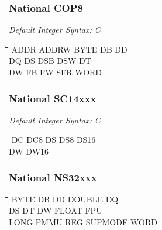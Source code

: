 \subsubsection{National COP8}

{\em Default Integer Syntax: C}

{\tt\begin{tabbing}
\hspace{3cm}\=\hspace{3cm}\=\hspace{3cm}\=\hspace{3cm}\=\kill
ADDR       \> ADDRW       \> BYTE        \> DB          \> DD \\
DQ         \> DS          \> DSB         \> DSW         \> DT \\
DW         \> FB          \> FW          \> SFR         \> WORD \\
\end{tabbing}}

\subsubsection{National SC14xxx}

{\em Default Integer Syntax: C}

{\tt\begin{tabbing}
\hspace{3cm}\=\hspace{3cm}\=\hspace{3cm}\=\hspace{3cm}\=\kill
DC         \> DC8         \> DS          \> DS8         \> DS16 \\
DW         \> DW16 \\
\end{tabbing}}

\subsubsection{National NS32xxx}
{\tt\begin{tabbing}
\hspace{3cm}\=\hspace{3cm}\=\hspace{3cm}\=\hspace{3cm}\=\kill
BYTE       \> DB          \> DD         \> DOUBLE       \> DQ \\
DS         \> DT          \> DW         \> FLOAT        \> FPU \\
LONG       \> PMMU        \> REG        \> SUPMODE      \> WORD \\
\end{tabbing}}

